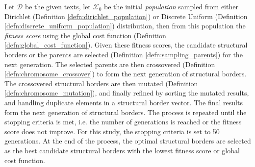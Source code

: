 \begin{defn}
    Let $\mathscr{D}$ be the given texts, let $\mathscr{X}_0$ be the initial \textit{population} sampled from either Dirichlet (Definition \ref{defn:dirichlet_population}) or Discrete Uniform (Definition \ref{defn:discrete_uniform_population}) distribution, then from this population the \textit{fitness score} using the global cost function (Definition \ref{defn:global_cost_function}). Given these fitness scores, the candidate structural borders or the parents are selected (Definition \ref{defn:sampling_parents}) for the next generation. The selected parents are then crossovered (Definition \ref{defn:chromosome_crossover}) to form the next generation of structural borders. The crossovered structural borders are then mutated (Definition \ref{defn:chromosome_mutation}), and finally refined by sorting the mutated results, and handling duplicate elements in a structural border vector. The final results form the next generation of structural borders. The process is repeated until the stopping criteria is met, i.e. the number of generations is reached or the fitness score does not improve. For this study, the stopping criteria is set to 50 generations. At the end of the process, the optimal structural borders are selected as the best candidate structural borders with the lowest fitness score or global cost function.
\end{defn}